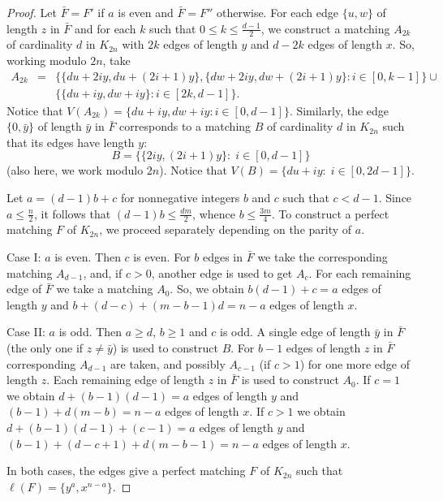 \documentclass{amsart}
\theoremstyle{definition}
\numberwithin{equation}{section}
\begin{document}
\begin{proof}
Let $\bar{F}=F'$ if $a$ is even and $\bar{F}=F''$ otherwise.
For each edge $\{u,w\}$ of length $z$ in $\bar{F}$ and for each $k$ such that $0\leq k\leq \frac{d-1}{2}$, we construct
a matching $A_{2k}$ of cardinality $d$ in $K_{2n}$ with $2k$ edges of length $y$ and $d-2k$ edges of length $x$.
So, working modulo $2n$, take
$$\begin{array}{rcl}
A_{2k} &=& \{\{d u+2iy,d u+(2i+1)y\},\{d w+2iy,d w+(2i+1)y\}:  i\in [0,k-1]\}\cup\\
&& \{\{d u+iy,d w+iy\}:  i\in [2k,d-1]\}.
\end{array}$$
Notice that $V(A_{2k})=\{du+iy,dw+iy: i\in[0,d-1]\}$.
Similarly, the edge $\{0,\bar y\}$ of length $\bar y$ in $\bar{F}$ corresponds to
a matching $B$ of cardinality $d$ in $K_{2n}$ such that its edges have length $y$:
$$B=\{\{2iy,(2i+1)y\}:\; i\in [0,d-1]\}$$
(also here, we  work modulo $2n$).
Notice that $V(B)=\{du+iy:\; i\in[0,2d-1]\}$.

Let $a=(d-1)b+c$ for nonnegative integers $b$ and $c$ such that $c<d-1$.
Since $a\leq \frac{n}{2}$, it follows that $(d-1)b \leq \frac{dm}{2}$, whence $b\leq\frac{3m}{4}$.
To construct a perfect matching $F$ of $K_{2n}$, we proceed separately depending on the parity of $a$.

\noindent Case I: $a$ is even.
Then $c$ is even. For $b$ edges in $\bar{F}$ we take the corresponding matching $A_{d-1}$,
and, if $c>0$, another edge is used to get $A_c$. 
For each remaining edge of $\bar{F}$  we take a matching $A_0$. 
So, we obtain $b(d-1)+c=a$ edges of length $y$ and $b+(d-c)+(m-b-1)d=n-a$ edges of length $x$.

\noindent Case II: $a$ is odd.
Then $a\geq d$, $b\geq 1$ and $c$ is odd.
A single edge of length $\bar y $ in $\bar{F}$ (the only one if $z\neq \bar y$) is used to construct $B$.
For $b-1$ edges of length $z$ in $\bar{F}$ corresponding $A_{d-1}$ are taken,
and possibly $A_{c-1}$ (if $c>1$) for one more edge of length $z$.
Each remaining edge of length $z$ in $\bar{F}$ is used to construct $A_0$.
If $c=1$ we obtain $d+(b-1)(d-1)=a$ edges of length $y$ and $(b-1)+d(m-b)=n-a$
edges of length $x$.
If $c>1$ we obtain $d+(b-1)(d-1)+(c-1)=a$ edges of length $y$ and $(b-1)+(d-c+1)+d(m-b-1)=n-a$ edges of length $x$.

In both cases,  the edges give a perfect matching $F$ of $K_{2n}$ such that $\ell(F)=\{y^a, x^{n-a}\}$.
\end{proof}
\end{document}
